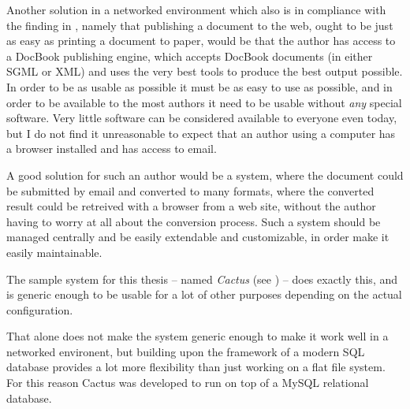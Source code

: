 Another solution in a networked environment which also is in
compliance with the finding in
,
namely that publishing a document to the web, ought to be just as easy
as printing a document to paper, would be that the author has access
to a DocBook publishing engine, which accepts DocBook documents (in
either SGML or XML) and uses the very best tools to produce the best
output possible.  In order to be as usable as possible it must be as
easy to use as possible, and in order to be available to the most
authors it need to be usable without \textit{any} special software.
Very little software can be considered available to everyone even
today, but I do not find it unreasonable to expect that an author
using a computer has a browser installed and has access to email.

A good solution for such an author would be a system, where the
document could be submitted by email and converted to many formats,
where the converted result could be retreived with a browser from a
web site, without the author having to worry at all about the
conversion process.  Such a system should be managed centrally and be
easily extendable and customizable, in order make it easily
maintainable.

The sample system for this thesis -- named \textit{Cactus} (see
) -- does exactly this, and is generic enough to be
usable for a lot of other purposes depending on the actual
configuration.

That alone does not make the system generic enough to make it work
well in a networked environent, but building upon the framework of
a modern SQL database provides a lot more flexibility than just
working on a flat file system.   For this reason Cactus was developed
to run on top of a MySQL relational database.


